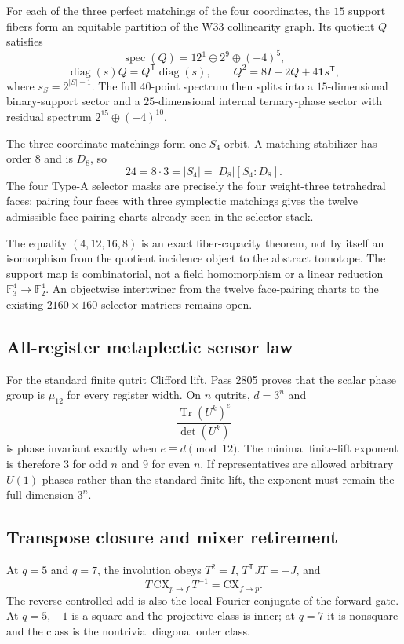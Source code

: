 For each of the three perfect matchings of the four coordinates, the $15$ support fibers
form an equitable partition of the W33 collinearity graph. Its quotient $Q$ satisfies
\[
 \operatorname{spec}(Q)=12^1\oplus2^9\oplus(-4)^5,
\]
\[
 \operatorname{diag}(s)Q=Q^{\mathsf T}\operatorname{diag}(s),
 \qquad
 Q^2=8I-2Q+4\mathbf1s^{\mathsf T},
\]
where $s_S=2^{|S|-1}$. The full $40$-point spectrum then splits into a $15$-dimensional
binary-support sector and a $25$-dimensional internal ternary-phase sector with residual
spectrum $2^{15}\oplus(-4)^{10}$.

The three coordinate matchings form one $S_4$ orbit. A matching stabilizer has order $8$
and is $D_8$, so
\[
 \boxed{24=8\cdot3=|S_4|=|D_8|[S_4:D_8]}.
\]
The four Type-A selector masks are precisely the four weight-three tetrahedral faces;
pairing four faces with three symplectic matchings gives the twelve admissible face-pairing
charts already seen in the selector stack.

\begin{gotwrong}
The equality $(4,12,16,8)$ is an exact fiber-capacity theorem, not by itself an
isomorphism from the quotient incidence object to the abstract tomotope. The support map
is combinatorial, not a field homomorphism or a linear reduction
$\mathbb F_3^4\to\mathbb F_2^4$. An objectwise intertwiner from the twelve face-pairing
charts to the existing $2160\times160$ selector matrices remains open.
\end{gotwrong}

\subsection{All-register metaplectic sensor law}
For the standard finite qutrit Clifford lift, Pass 2805 proves that the scalar phase group
is $\mu_{12}$ for every register width. On $n$ qutrits, $d=3^n$ and
\[
 \frac{\operatorname{Tr}(U^k)^e}{\det(U^k)}
\]
is phase invariant exactly when $e\equiv d\pmod{12}$. The minimal finite-lift exponent is
therefore $3$ for odd $n$ and $9$ for even $n$. If representatives are allowed arbitrary
$U(1)$ phases rather than the standard finite lift, the exponent must remain the full
dimension $3^n$.

\subsection{Transpose closure and mixer retirement}
At $q=5$ and $q=7$, the involution obeys $T^2=I$, $T^{\mathsf T}JT=-J$, and
\[
 T\,\mathrm{CX}_{p\to f}\,T^{-1}=\mathrm{CX}_{f\to p}.
\]
The reverse controlled-add is also the local-Fourier conjugate of the forward gate. At
$q=5$, $-1$ is a square and the projective class is inner; at $q=7$ it is nonsquare and
the class is the nontrivial diagonal outer class.

